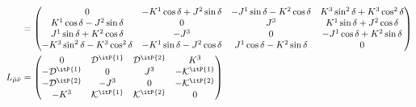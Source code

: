 \documentclass[]{article}
\numberwithin{equation}{section}
\begin{document}
{{\begin{align}
    &=\begin{pmatrix}
    0&-K^1\cos{\delta}+J^2\sin{\delta}&-J^1\sin{\delta}-K^2\cos{\delta}&K^3\sin^2{\delta}+K^3\cos^2{\delta}\\
    K^1\cos{\delta}-J^2\sin{\delta}&0&J^3&K^1\sin{\delta+J^2\cos{\delta}}\\
    J^1\sin{\delta}+K^2\cos{\delta}&-J^3&0&-J^1\cos{\delta+K^2\sin{\delta}}\\
    -K^3\sin^2{\delta}-K^3\cos^2{\delta}&-K^1\sin{\delta-J^2\cos{\delta}}&J^1\cos{\delta-K^2\sin{\delta}}&0\\
    \end{pmatrix}\\
    L_{\hat{\mu}\hat{\nu}}&=\begin{pmatrix}
    0 & {\mathcal{D}}^{\itP{1}} & {\mathcal{D}}^{\itP{2}} & {K}^{3}\\
    -{\mathcal{D}}^{\itP{1}} & 0 & {J}^{3} & -{\mathcal{K}}^{\itP{1}}\\
    -{\mathcal{D}}^{\itP{2}} & -{J}^{3} & 0 & -{\mathcal{K}}^{\itP{2}}\\
    -{K}^{3} & {\mathcal{K}}^{\itP{1}} & {\mathcal{K}}^{\itP{2}} & 0
  \end{pmatrix}
\end{align}
 
}}
\end{document}
